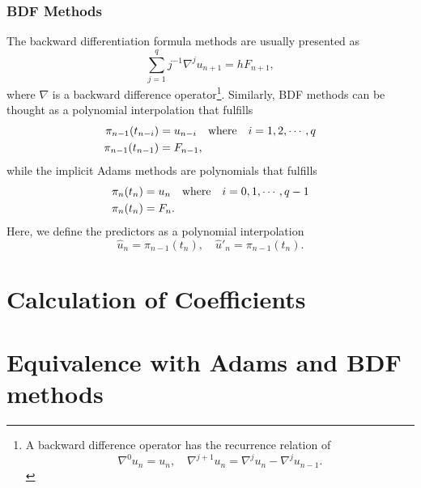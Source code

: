 \documentclass[11pt,a4paper]{article}
\begin{document}
\subsubsection{BDF Methods} \label{subsec:bdf}
The backward differentiation formula methods are usually
presented as
\begin{equation} \label{eq:BDF_int}
  \sum_{j=1}^q j^{-1}\nabla^ju_{n+1} = hF_{n+1},
\end{equation}
where $\nabla$ is a backward difference operator\footnote{A backward
difference operator has the recurrence relation of
\[
  \nabla^0u_n = u_n,\quad \nabla^{j+1}u_n = \nabla^ju_n-\nabla^ju_{n-1}.
\]}.
Similarly, BDF methods can be thought as a polynomial interpolation
that fulfills
\begin{align}
  \pi_{n-1}(t_{n-i})&=u_{n-i}\qq{where} i=1,2,\cdots,q \\
  \pi_{n-1}(t_{n-1})&=F_{n-1},
\end{align}
while the implicit Adams methods are polynomials that fulfills
\begin{align}
  \pi_{n}(t_{n})&=u_{n}\qq{where} i=0,1,\cdots,q-1 \\
  \pi_{n}(t_{n})&=F_{n}.
\end{align}
Here, we define the predictors as a polynomial interpolation
\begin{equation}
  \hat{u}_n = \pi_{n-1}(t_n),\quad \hat{u}'_n = \pi_{n-1}(t_n).
\end{equation}

\section{Calculation of Coefficients}

\section{Equivalence with Adams and BDF methods}
\end{document}
